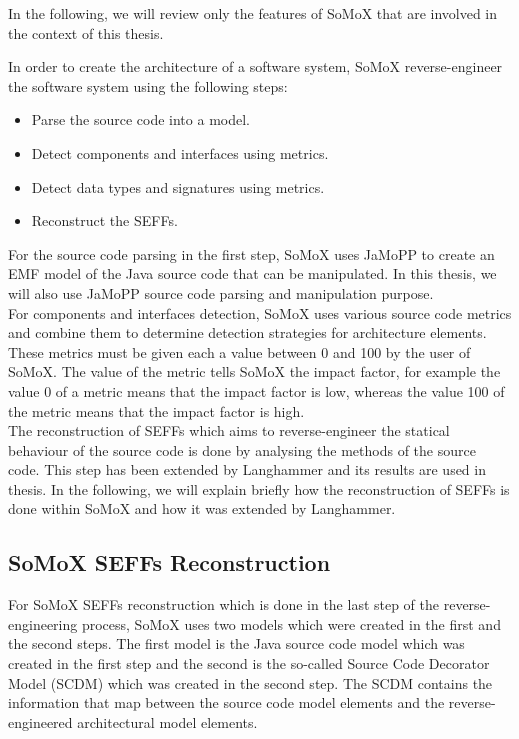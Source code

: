 In the following, we will review only the features of SoMoX that are involved in the context of this thesis. 

In order to create the architecture of a software system, SoMoX reverse-engineer the software system using the following steps:
\begin{itemize}
\item Parse the source code into a model.  
\item Detect components and interfaces using metrics.
\item Detect data types and signatures using metrics.
\item Reconstruct the SEFFs.
\end{itemize}

For the source code parsing in the first step, SoMoX uses JaMoPP to create an EMF model of the Java source code that can be manipulated. In this thesis, we will also use JaMoPP source code parsing and manipulation purpose.\\

For components and interfaces detection, SoMoX uses various source code metrics and combine them to determine detection strategies for architecture elements. These metrics must be given each a value between 0 and 100 by the user of SoMoX. The value of the metric tells SoMoX the impact factor, for example the value 0 of a metric means that the impact factor is low, whereas the value 100 of the metric means that the impact factor is high. \\

The reconstruction of SEFFs which aims to reverse-engineer the statical behaviour of the source code is done by analysing the methods of the source code. This step has been extended by Langhammer \cite{langhammer2017automated} and its results are used in thesis. In the following, we will explain briefly how the reconstruction of SEFFs is done within SoMoX and how it was extended by Langhammer.\\

\subsection{SoMoX SEFFs Reconstruction}  
\label{sec:SoMoX SEFFs Reconstruction}
For SoMoX SEFFs reconstruction which is done in the last step of the reverse-engineering process, SoMoX uses two models which were created in the first and the second steps. The first model is the Java source code model which was created in the first step and the second is the so-called Source Code Decorator Model (SCDM) which was created in the second step. The SCDM contains the information that map between the source code model elements and the reverse-engineered architectural model elements.\\

